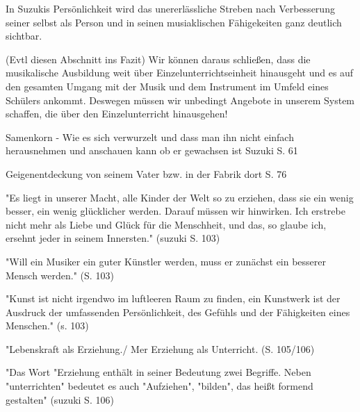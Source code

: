 In Suzukis Persönlichkeit wird das unererlässliche Streben nach Verbesserung
seiner selbst als Person und in seinen musiaklischen Fähigekeiten ganz deutlich
sichtbar. 

(Evtl diesen Abschnitt ins Fazit)
Wir können daraus schließen, dass die musikalische Ausbildung weit über
Einzelunterrichtseinheit hinausgeht und es auf den gesamten Umgang mit der Musik
und dem Instrument im Umfeld eines Schülers ankommt. Deswegen müssen wir
unbedingt Angebote in unserem System schaffen, die über den Einzelunterricht
hinausgehen! 


Samenkorn
- Wie es sich verwurzelt und dass man ihn nicht einfach herausnehmen und
anschauen kann ob er gewachsen ist Suzuki S. 61

Geigenentdeckung von seinem Vater bzw. in der Fabrik dort S. 76


"Es liegt in unserer Macht, alle Kinder der Welt so zu erziehen, dass sie ein
wenig besser, ein wenig glücklicher werden. Darauf müssen wir hinwirken. Ich
erstrebe nicht mehr als Liebe und Glück für die Menschheit, und das, so glaube
ich, ersehnt jeder in seinem Innersten." (suzuki S. 103)

"Will ein Musiker ein guter Künstler werden, muss er zunächst ein besserer
Mensch werden." (S. 103)

"Kunst ist nicht irgendwo im luftleeren Raum zu finden, ein Kunstwerk ist der
Ausdruck der umfassenden Persönlichkeit, des Gefühls und der Fähigkeiten eines
Menschen." (s. 103)

"Lebenskraft als Erziehung./ Mer Erziehung als Unterricht. (S. 105/106)

"Das Wort "Erziehung enthält in seiner Bedeutung zwei Begriffe. Neben
"unterrichten" bedeutet es auch "Aufziehen", "bilden", das heißt formend
gestalten" (suzuki S. 106)
